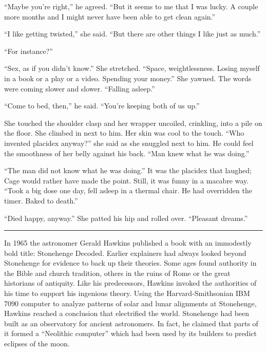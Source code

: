 ``Maybe you're right,'' he agreed. ``But it seems to me that I was lucky. A couple more months and I might never have been able to get clean again.''

``I like getting twisted,'' she said. ``But there are other things I like just as much.''

``For instance?''

``Sex, as if you didn't know.'' She stretched. ``Space, weightlessness. Losing myself in a book or a play or a video. Spending your money.'' She yawned. The words were coming slower and slower. ``Falling asleep.''

``Come to bed, then,'' he said. ``You're keeping both of us up.''

She touched the shoulder clasp and her wrapper uncoiled, crinkling, into a pile on the floor. She climbed in next to him. Her skin was cool to the touch. ``Who invented placidex anyway?'' she said as she snuggled next to him. He could feel the smoothness of her belly against his back. ``Man knew what he was doing.''

``The man did not know what he was doing.'' It was the placidex that laughed; Cage would rather have made the point. Still, it was funny in a macabre way. ``Took a big dose one day, fell asleep in a thermal chair. He had overridden the timer. Baked to death.''

``Died happy, anyway.'' She patted his hip and rolled over. ``Pleasant dreams.''

\fancybreak{* * *}

In 1965 the astronomer Gerald Hawkins published a book with an immodestly bold title: Stonehenge Decoded. Earlier explainers had always looked beyond Stonehenge for evidence to back up their theories. Some ages found authority in the Bible and church tradition, others in the ruins of Rome or the great historians of antiquity. Like his predecessors, Hawkins invoked the authorities of his time to support his ingenious theory. Using the Harvard-Smithsonian IBM 7090 computer to analyze patterns of solar and lunar alignments at Stonehenge, Hawkins reached a conclusion that electrified the world. Stonehenge had been built as an observatory for ancient astronomers. In fact, he claimed that parts of it formed a ``Neolithic computer'' which had been used by its builders to predict eclipses of the moon.

